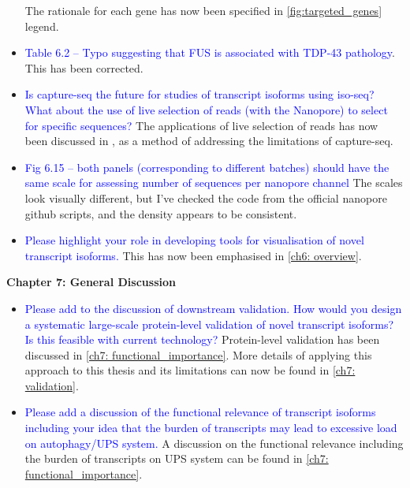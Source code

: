 \documentclass[a4paper,12pt,oneside]{report}
\begin{document}
\begin{itemize}
	\newline The rationale for each gene has now been specified in \cref{fig:targeted_genes} legend.
	\item \textcolor{blue}{Table 6.2 – Typo suggesting that FUS is associated with TDP-43 pathology}. 
	\newline This has been corrected. 
	\item \textcolor{blue}{Is capture-seq the future for studies of transcript isoforms using iso-seq? What about the use of live selection of reads (with the Nanopore) to select for specific sequences?}
	\newline The applications of live selection of reads has now been discussed in \label{ch6: limitation}, as a method of addressing the limitations of capture-seq.
	\item \textcolor{blue}{Fig 6.15 – both panels (corresponding to different batches) should have the same scale for assessing number of sequences per nanopore channel}
	\newline The scales look visually different, but I've checked the code from the official nanopore github scripts, and the density appears to be consistent.  
	\item \textcolor{blue}{Please highlight your role in developing tools for visualisation of novel transcript isoforms.}
	\newline This has now been emphasised in \cref{ch6: overview}.
\end{itemize}

\vspace{1cm}
\textbf{Chapter 7: General Discussion}
\begin{itemize}
	\item \textcolor{blue}{Please add to the discussion of downstream validation. How would you design a systematic large-scale protein-level validation of novel transcript isoforms? Is this feasible with current technology?} 
	\newline Protein-level validation has been discussed in \cref{ch7: functional_importance}. More details of applying this approach to this thesis and its limitations can now be found in \cref{ch7: validation}.
	\item \textcolor{blue}{Please add a discussion of the functional relevance of transcript isoforms including your idea that the burden of transcripts may lead to excessive load on autophagy/UPS system.}
	\newline A discussion on the functional relevance including the burden of transcripts on UPS system can be found in \cref{ch7: functional_importance}.
\end{itemize}
\end{document}
